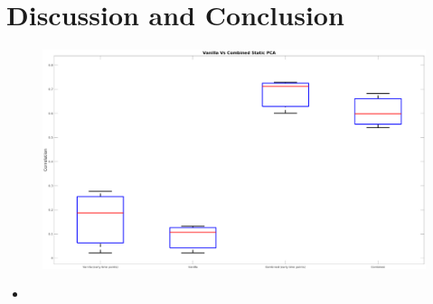 \chapter{Discussion and Conclusion} \label{sec:discussion_and_conclusion}
    \newpage
    
        
    
        \begin{figure}
            \centering
                
            \includegraphics[width=1.0\linewidth]{figures/data_driven_surrogate_signal_extraction_results_1_box_plot_processed.png}
                
            \captionsetup{singlelinecheck=false, justification=centering}
            \caption{}
            \label{fig:future_work_gantt_chart}
        \end{figure}
        
        \begin{itemize}
            \item 
        \end{itemize}
